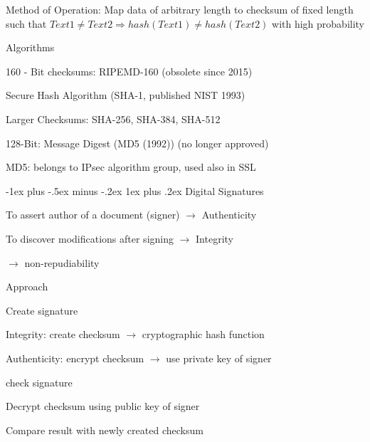 \documentclass[a4paper]{article}
\makeatletter
\renewcommand{\subsubsection}{\@startsection{subsubsection}{3}{0mm}%
                {-1ex plus -.5ex minus -.2ex}%
                {1ex plus .2ex}%
                {\normalfont\small\bfseries}}
\makeatother
\begin{document}
\begin{multicols}{3}
    Method of Operation: Map data of arbitrary length to checksum of fixed length such that $Text1 \not= Text2 \Rightarrow hash(Text1) \not= hash(Text2)$ with high probability

    Algorithms
    \begin{itemize*}
        \item 160 - Bit checksums: RIPEMD-160 (obsolete since 2015)
        \item Secure Hash Algorithm (SHA-1, published NIST 1993)
        \item Larger Checksums: SHA-256, SHA-384, SHA-512
        \item 128-Bit: Message Digest (MD5 (1992)) (no longer approved)
        \item MD5: belongs to IPsec algorithm group, used also in SSL
    \end{itemize*}

    \subsubsection{Digital Signatures}
    \begin{itemize*}
        \item To assert author of a document (signer) $\rightarrow$ Authenticity
        \item To discover modifications after signing $\rightarrow$ Integrity
        \item[$\rightarrow$] non-repudiability
    \end{itemize*}

    Approach
    \begin{itemize*}
        \item Create signature
        \begin{itemize*}
            \item Integrity: create checksum $\rightarrow$ cryptographic hash function
            \item Authenticity: encrypt checksum $\rightarrow$ use private key of signer
        \end{itemize*}
        \item check signature
        \begin{itemize*}
            \item Decrypt checksum using public key of signer
            \item Compare result with newly created checksum
        \end{itemize*}
    \end{itemize*}


\end{multicols}
\end{document}
